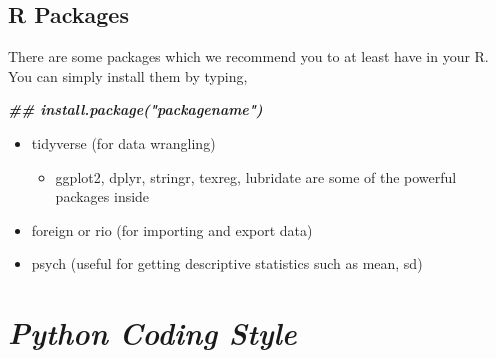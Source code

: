 \documentclass[
]{book}
\newenvironment{Shaded}{\begin{snugshade}}{\end{snugshade}}
\newcommand{\DocumentationTok}[1]{\textcolor[rgb]{0.56,0.35,0.01}{\textbf{\textit{#1}}}}
\providecommand{\tightlist}{%
  \setlength{\itemsep}{0pt}\setlength{\parskip}{0pt}}
\begin{document}
\hypertarget{r-packages}{%
\subsection{R Packages}\label{r-packages}}

There are some packages which we recommend you to at least have in your R. You can simply install them by typing,

\begin{Shaded}
\begin{Highlighting}[]
\DocumentationTok{\#\# install.package("packagename")}
\end{Highlighting}
\end{Shaded}

\begin{itemize}
\item
  tidyverse (for data wrangling)

  \begin{itemize}
  \tightlist
  \item
    ggplot2, dplyr, stringr, texreg, lubridate are some of the powerful packages inside
  \end{itemize}
\item
  foreign or rio (for importing and export data)
\item
  psych (useful for getting descriptive statistics such as mean, sd)
\end{itemize}

\hypertarget{python-coding-style}{%
\section{\texorpdfstring{\emph{Python Coding Style}}{Python Coding Style}}\label{python-coding-style}}
\end{document}
